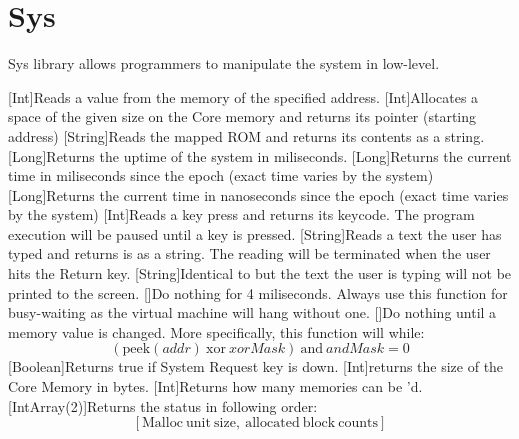 \section{Sys}

Sys library allows programmers to manipulate the system in low-level.


\begin{outline}
\1
\1[Int]{Reads a value from the memory of the specified address.}
\1[Int]{Allocates a space of the given size on the Core memory and returns its pointer (starting address)}
\1
\1
\1
\1[String]{Reads the mapped ROM and returns its contents as a string.}
\1[Long]{Returns the uptime of the system in miliseconds.}
\1[Long]{Returns the current time in miliseconds since the epoch (exact time varies by the system)}
\1[Long]{Returns the current time in nanoseconds since the epoch (exact time varies by the system)}
\1
\1
\1[Int]{Reads a key press and returns its keycode. The program execution will be paused until a key is pressed.}
\1[String]{Reads a text the user has typed and returns is as a string. The reading will be terminated when the user hits the Return key.}
\1[String]{Identical to  but the text the user is typing will not be printed to the screen.}
\1[]{Do nothing for 4 miliseconds. Always use this function for busy-waiting as the virtual machine will hang without one.}
\1[]{Do nothing until a memory value is changed. More specifically, this function will  while:$$ (\mathrm{peek}(addr)\ \mathrm{xor}\ xorMask)\ \mathrm{and}\ andMask = 0 $$}
\1[Boolean]{Returns true if System Request key is down.}
\1
\1[Int]{returns the size of the Core Memory in bytes.}
\1[Int]{Returns how many memories can be 'd.}
\1[IntArray(2)]{Returns the  status in following order:$$ [\mathrm{Malloc\ unit\ size,\ allocated\ block\ counts}] $$}
\end{outline}





